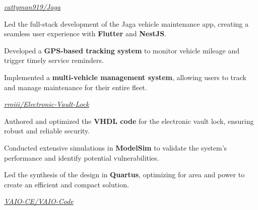 \documentclass[../main.tex]{subfiles}
\begin{document}
\vspace{0.2 cm}

\begin{twocolentry}{
    \small
    \textit{\href{https://github.com/cattyman919/Jaga}{cattyman919/Jaga}}
}
\end{twocolentry}

\vspace{0.10 cm}
\begin{onecolentry}
\begin{highlights}
    \item Led the full-stack development of the Jaga vehicle maintenance app, creating a seamless user experience with \textbf{Flutter} and \textbf{NestJS}.
    \item Developed a \textbf{GPS-based tracking system} to monitor vehicle mileage and trigger timely service reminders.
    \item Implemented a \textbf{multi-vehicle management system}, allowing users to track and manage maintenance for their entire fleet.
\end{highlights}
\end{onecolentry}

\vspace{0.2 cm}

\begin{twocolentry}{
    \small
    \textit{\href{https://github.com/rroiii/Electronic-Vault-Lock}{rroiii/Electronic-Vault-Lock}}
}
\end{twocolentry}

\vspace{0.10 cm}
\begin{onecolentry}
\begin{highlights}
    \item Authored and optimized the \textbf{VHDL code} for the electronic vault lock, ensuring robust and reliable security.
    \item Conducted extensive simulations in \textbf{ModelSim} to validate the system's performance and identify potential vulnerabilities.
    \item Led the synthesis of the design in \textbf{Quartus}, optimizing for area and power to create an efficient and compact solution.
\end{highlights}
\end{onecolentry}

\vspace{0.2 cm}

\begin{twocolentry}{
    \small
    \textit{\href{https://github.com/VAIO-CE/VAIO-Code}{VAIO-CE/VAIO-Code}}
}
\end{twocolentry}
\end{document}
